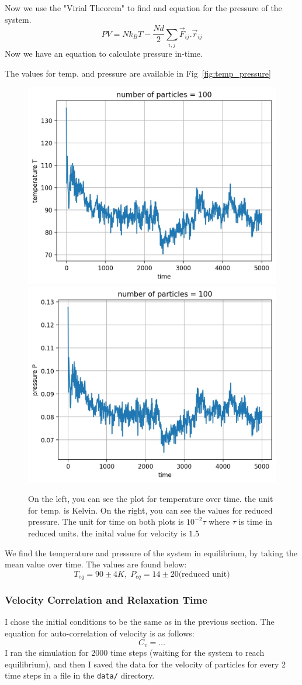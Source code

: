 \documentclass[12pt, a4paper]{article}
\begin{document}
	Now we use the "Virial Theorem" to find and equation for the pressure of the system.
	\begin{equation}
		P V = N k_B T - \frac{N d}{2} \sum_{i,j} \vec{F}_{ij}.\vec{r}_{ij}
	\end{equation}
	 Now we have an equation to calculate pressure in-time. 
	 
	 The values for temp. and pressure are available in Fig~\ref{fig:temp_pressure}
	 
	 \begin{figure}[h!]
		\centering
		\includegraphics[width=.45\linewidth]{../results/temp100_5000.jpg}
		\includegraphics[width=.45\linewidth]{../results/pressure100_5000.jpg}
		\caption{On the left, you can see the plot for temperature over time. the unit for temp. is Kelvin. On the right, you can see the values for 
		reduced pressure. The unit for time on both plots is $10^{-2} \tau$ where $\tau$ is time in reduced units.
		the inital value for velocity is $1.5$}
	 \end{figure}
 
 	We find the temperature and pressure of the system in equilibrium, by taking the mean value over time. The values are found below:
 	\begin{equation*}
 		T_{eq} = 90 \pm 4 K, \; P_{eq} = 14 \pm 20 \text{(reduced unit)}
 	\end{equation*}
	
	\subsubsection{Velocity Correlation and Relaxation Time}
	I chose the initial conditions to be the same as in the previous section. The equation for auto-correlation of 
	velocity is as follows:
	\begin{equation}
		C_v = \dots
	\end{equation}
	I ran the simulation for 2000 time steps (waiting for the system to reach equilibrium), and then I saved the
	data for the velocity of particles for every 2 time steps in a file in the \texttt{data/} directory.
	
\end{document}
